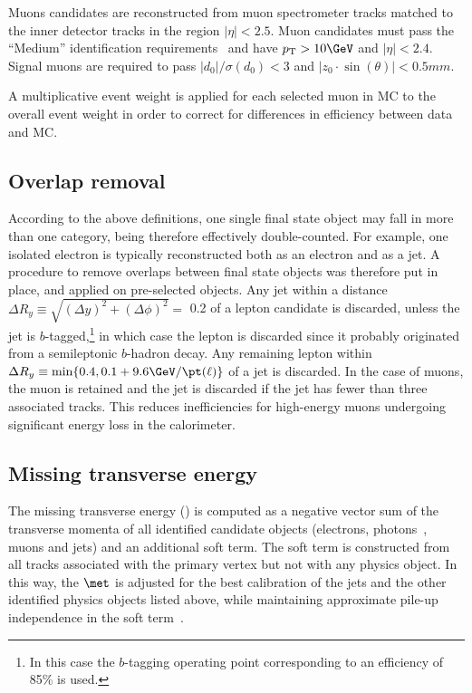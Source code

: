 Muons candidates are reconstructed from muon spectrometer tracks matched to 
the inner detector tracks in the region $|\eta|<2.5$.
Muon candidates must pass the ``Medium'' identification 
requirements~\cite{Aad:2016jkr} and have  $p_\mathrm{T} > 10\GeV$ and 
$|\eta| < 2.4$. 
Signal muons are required to pass $\vert d_0\vert/\sigma(d_0) < 3$
and $|z_0 \cdot\sin(\theta)|<0.5 mm$.
 
A multiplicative event weight is applied for each selected muon in MC to the overall event weight 
in order to correct for differences in efficiency between data and MC.

\subsection*{Overlap removal}
\label{subsec:sec.strategy.sel.objects_overlap_removal}

According to the above definitions, one single final state object may fall in more than one category, being therefore effectively double-counted. 
For example, one isolated electron is typically reconstructed both as an electron and as a jet. 
A procedure to remove overlaps between final state objects was therefore put in place, and applied on pre-selected objects. 
Any jet within a distance $\Delta R_y \equiv \sqrt{(\Delta y)^2+(\Delta\phi)^2} =$ 0.2 of a lepton candidate is discarded, 
unless the jet is $b$-tagged,\footnote{In this case the $b$-tagging operating point corresponding to an efficiency of 85\% is used.} 
in which case the lepton is discarded since it probably originated from a semileptonic $b$-hadron decay. 
Any remaining lepton within $\Delta R_y \equiv \operatorname{min}\{0.4, 0.1 + 9.6 \GeV/\pt(\ell)\}$ of a jet is discarded. 
In the case of muons, the muon is retained and the jet is discarded if the jet has fewer than three associated tracks. This reduces 
inefficiencies for high-energy muons undergoing significant energy loss in the calorimeter. 

\subsection*{Missing transverse energy}
\label{subsec:sec.strategy.sel.objects_met}

The missing transverse energy (\met) is computed as a negative vector sum of 
the transverse momenta 
of all identified candidate objects (electrons, photons~\cite{Aaboud:2016yuq}, muons and jets) and an additional soft term. 
The soft term is constructed from all tracks associated with the primary vertex but not with any physics object. 
In this way, the $\met$ is adjusted for the best calibration of the jets and the other identified physics objects listed above, 
while maintaining approximate pile-up independence in the soft term~\cite{ATL-PHYS-PUB-2015-027, ATL-PHYS-PUB-2015-023}.

